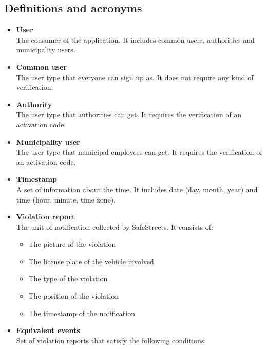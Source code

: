 \documentclass[a4paper]{article}
\begin{document}
\subsection{Definitions and acronyms}

\begin{itemize}
\item
  \textbf{User}\\
  The consumer of the application. It includes common users, authorities
  and municipality users.
\item
  \textbf{Common user}\\
  The user type that everyone can sign up as. It does not require any
  kind of verification.
\item
  \textbf{Authority}\\
  The user type that authorities can get. It requires the verification
  of an activation code.
\item
  \textbf{Municipality user}\\
  The user type that municipal employees can get. It requires the
  verification of an activation code.
\item
  \textbf{Timestamp}\\
  A set of information about the time. It includes date (day, month,
  year) and time (hour, minute, time zone).
\item
  \textbf{Violation report}\\
  The unit of notification collected by SafeStreets. It consists of:

  \begin{itemize}
  \item
    The picture of the violation
  \item
    The license plate of the vehicle involved
  \item
    The type of the violation
  \item
    The position of the violation
  \item
    The timestamp of the notification
  \end{itemize}
\item
  \textbf{Equivalent events}\\
  Set of violation reports that satisfy the following conditions:


\end{itemize}
\end{document}
